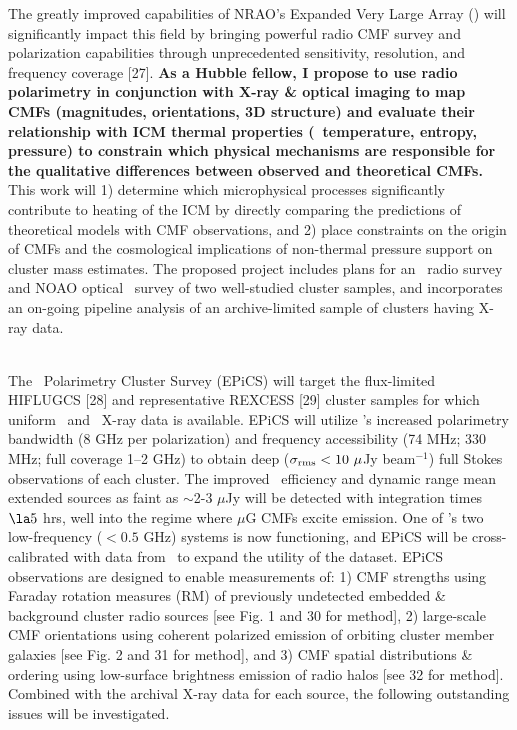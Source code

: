 \documentclass[letterpaper,12pt]{article}
\newcommand{\myhead}{Cavagnolo, Hubble Proposal}
\begin{document}
The greatly improved capabilities of NRAO's Expanded Very Large Array
(\evla) will significantly impact this field by bringing powerful
radio CMF survey and polarization capabilities through unprecedented
sensitivity, resolution, and frequency coverage [27]. {\bf{As a Hubble
    fellow, I propose to use radio polarimetry in conjunction with
    X-ray \& optical imaging to map CMFs (magnitudes, orientations, 3D
    structure) and evaluate their relationship with ICM thermal
    properties (\eg\ temperature, entropy, pressure) to constrain
    which physical mechanisms are responsible for the qualitative
    differences between observed and theoretical CMFs.}}  This work
will 1) determine which microphysical processes significantly
contribute to heating of the ICM by directly comparing the predictions
of theoretical models with CMF observations, and 2) place constraints
on the origin of CMFs and the cosmological implications of non-thermal
pressure support on cluster mass estimates. The proposed project
includes plans for an \evla\ radio survey and NOAO optical
\halpha\ survey of two well-studied cluster samples, and incorporates
an on-going pipeline analysis of an archive-limited sample of clusters
having X-ray data.\\

\markright{\myhead}\\
\indent The \evla\ Polarimetry Cluster Survey (EPiCS) will target the
flux-limited HIFLUGCS [28] and representative REXCESS [29] cluster
samples for which uniform \chandra\ and \xmm\ X-ray data is
available. EPiCS will utilize \evla's increased polarimetry bandwidth
(8 GHz per polarization) and frequency accessibility (74 MHz; 330 MHz;
full coverage 1--2 GHz) to obtain deep ($\sigma_{\rm{rms}} < 10
~\mu$Jy beam$^{-1}$) full Stokes observations of each cluster. The
improved \evla\ efficiency and dynamic range mean extended sources as
faint as $\sim$2-3 $\mu$Jy will be detected with integration times
$\la 5$ hrs, well into the regime where $\mu$G CMFs excite
emission. One of \evla's two low-frequency ($< 0.5$ GHz) systems is
now functioning, and EPiCS will be cross-calibrated with data from
\lofar\ to expand the utility of the dataset. EPiCS observations are
designed to enable measurements of: 1) CMF strengths using Faraday
rotation measures (RM) of previously undetected embedded \& background
cluster radio sources [see Fig. 1 and 30 for method], 2) large-scale
CMF orientations using coherent polarized emission of orbiting cluster
member galaxies [see Fig. 2 and 31 for method], and 3) CMF spatial
distributions \& ordering using low-surface brightness emission of
radio halos [see 32 for method]. Combined with the archival X-ray data
for each source, the following outstanding issues will be
investigated.
\end{document}
